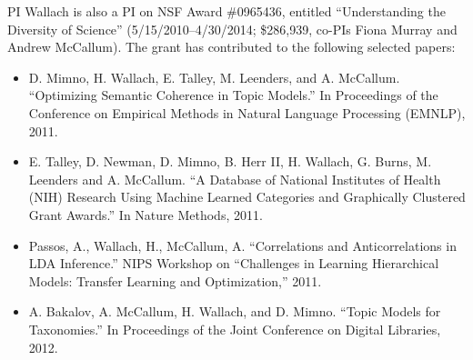 


PI Wallach is also a PI on NSF Award \#0965436, entitled
``Understanding the Diversity of Science'' (5/15/2010--4/30/2014;
\$286,939, co-PIs Fiona Murray and Andrew McCallum). The grant has
contributed to the following selected papers:

\begin{itemize}

\item D. Mimno, H. Wallach, E. Talley, M. Leenders, and
  A. McCallum. ``Optimizing Semantic Coherence in Topic Models.'' In
  Proceedings of the Conference on Empirical Methods in Natural
  Language Processing (EMNLP), 2011.

\item E. Talley, D. Newman, D. Mimno, B. Herr II, H. Wallach,
  G. Burns, M. Leenders and A. McCallum. ``A Database of National
  Institutes of Health (NIH) Research Using Machine Learned Categories
  and Graphically Clustered Grant Awards.'' In Nature Methods, 2011.

\item Passos, A., Wallach, H., McCallum, A. ``Correlations and
  Anticorrelations in LDA Inference.'' NIPS Workshop on ``Challenges
  in Learning Hierarchical Models: Transfer Learning and
  Optimization,'' 2011.

\item A. Bakalov, A. McCallum, H. Wallach, and D. Mimno. ``Topic
  Models for Taxonomies.'' In Proceedings of the Joint Conference on
  Digital Libraries, 2012.

\end{itemize}


